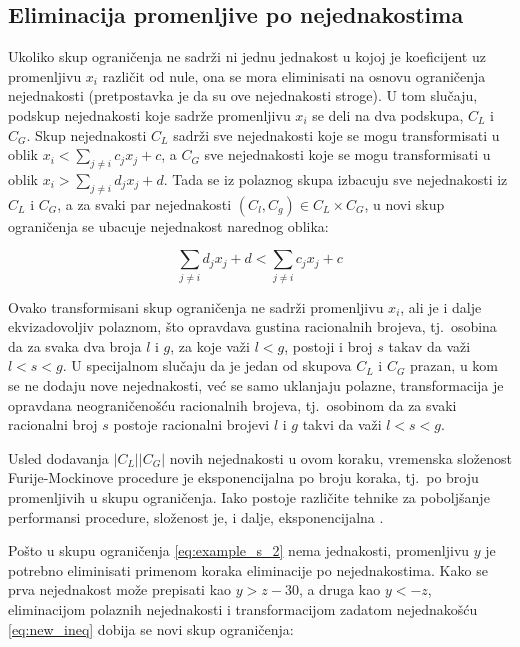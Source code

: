 \documentclass[a4paper,10pt]{article}
\begin{document}
\subsection{Eliminacija promenljive po nejednakostima}

Ukoliko skup ograničenja ne sadrži ni jednu jednakost u kojoj je koeficijent uz promenljivu $x_i$ različit od nule, ona se mora eliminisati na osnovu ograničenja nejednakosti (pretpostavka je da su ove nejednakosti stroge). U tom slučaju, podskup nejednakosti koje sadrže promenljivu $x_i$ se deli na dva podskupa, $C_L$ i $C_G$. Skup nejednakosti $C_L$ sadrži sve nejednakosti koje se mogu transformisati u oblik $x_i < \sum_{j \ne i}{c_jx_j + c}$, a $C_G$ sve nejednakosti koje se mogu transformisati u oblik $x_i > \sum_{j \ne i}{d_jx_j + d}$. Tada se iz polaznog skupa izbacuju sve nejednakosti iz $C_L$ i $C_G$, a za svaki par nejednakosti $(C_l, C_g) \in C_L \times C_G$, u novi skup ograničenja se ubacuje nejednakost narednog oblika:

\begin{equation}
    \label{eq:new_ineq}
    \sum_{j \ne i}{d_jx_j + d} < \sum_{j \ne i}{c_jx_j + c}
\end{equation}

Ovako transformisani skup ograničenja ne sadrži promenljivu $x_i$, ali je i dalje ekvizadovoljiv polaznom, što opravdava gustina racionalnih brojeva, tj.~osobina da za svaka dva broja $l$ i $g$, za koje važi $l < g$, postoji i broj $s$ takav da važi $l < s < g$. U specijalnom slučaju da je jedan od skupova $C_L$ i $C_G$ prazan, u kom se ne dodaju nove nejednakosti, već se samo uklanjaju polazne, transformacija je opravdana neograničenošću racionalnih brojeva, tj.~osobinom da za svaki racionalni broj $s$ postoje racionalni brojevi $l$ i $g$ takvi da važi $l < s < g$.

Usled dodavanja $|C_L||C_G|$ novih nejednakosti u ovom koraku, vremenska složenost Furije-Mockinove procedure je eksponencijalna po broju koraka, tj.~po broju promenljivih u skupu ograničenja. Iako postoje različite tehnike za poboljšanje performansi procedure, složenost je, i dalje, eksponencijalna \cite{complexity-estimates-fourier-motzkin}.

Pošto u skupu ograničenja \eqref{eq:example_s_2} nema jednakosti, promenljivu $y$ je potrebno eliminisati primenom koraka eliminacije po nejednakostima. Kako se prva nejednakost može prepisati kao $y > z - 30$, a druga kao $y < -z$, eliminacijom polaznih nejednakosti i transformacijom zadatom nejednakošću \eqref{eq:new_ineq} dobija se novi skup ograničenja:
\end{document}
